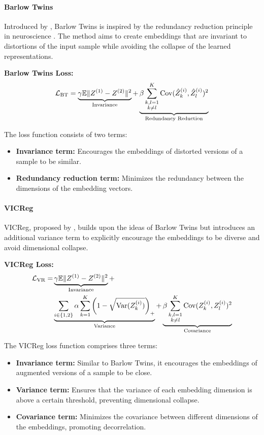 \paragraph{Barlow Twins}
Introduced by \citet{zbontar2021barlow}, Barlow Twins is inspired by the redundancy reduction principle in neuroscience \citep{barlow1961possible}. The method aims to create embeddings that are invariant to distortions of the input sample while avoiding the collapse of the learned representations.

\textbf{Barlow Twins Loss:}
\begin{equation}
\mathcal{L}_\text{BT} = \underbrace{\gamma \mathbb{E} \lVert Z^{(1)} - Z^{(2)}\rVert^2}_{\text{Invariance}} + \underbrace{\beta \sum_{\substack{k,l=1 \\ k \neq l}}^K \mathrm{Cov}(\hat{Z}^{(i)}_k, \hat{Z}^{(i)}_l)^2}_{\text{Redundancy Reduction}}
\end{equation}

The loss function consists of two terms:
\begin{itemize}
    \item \textbf{Invariance term:} Encourages the embeddings of distorted versions of a sample to be similar.
    \item \textbf{Redundancy reduction term:} Minimizes the redundancy between the dimensions of the embedding vectors.
\end{itemize}

\paragraph{VICReg}
VICReg, proposed by \citet{bardes2021vicreg}, builds upon the ideas of Barlow Twins but introduces an additional variance term to explicitly encourage the embeddings to be diverse and avoid dimensional collapse.

\textbf{VICReg Loss:}
\begin{equation}
\begin{split}
\mathcal{L}_\text{VR} = &\underbrace{\gamma \mathbb{E} \lVert Z^{(1)} - Z^{(2)}\rVert^2}_{\text{Invariance}} + \\
&\underbrace{\sum_{i \in \{1,2\}} \alpha \sum_{k=1}^K \left(1 - \sqrt{\mathrm{Var}(Z^{(i)}_k)}\right)_+}_{\text{Variance}} + 
\underbrace{\beta \sum_{\substack{k,l=1 \\ k \neq l}}^K \mathrm{Cov}(Z^{(i)}_k, Z^{(i)}_l)^2}_{\text{Covariance}}
\end{split}
\end{equation}

The VICReg loss function comprises three terms:
\begin{itemize}
    \item \textbf{Invariance term:} Similar to Barlow Twins, it encourages the embeddings of augmented versions of a sample to be close.
    \item \textbf{Variance term:} Ensures that the variance of each embedding dimension is above a certain threshold, preventing dimensional collapse.
    \item \textbf{Covariance term:} Minimizes the covariance between different dimensions of the embeddings, promoting decorrelation.
\end{itemize}

